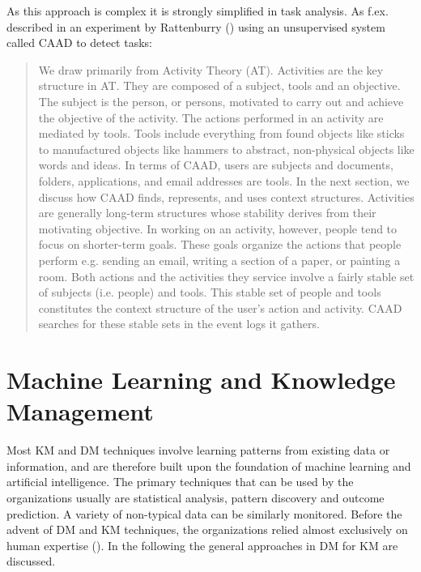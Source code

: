 As this approach is complex it is strongly simplified in task analysis. As f.ex. described in an experiment by Rattenburry (\cite{rattenbury2007caad}) using an unsupervised system called CAAD to detect tasks:
\begin{quotation}
We draw primarily from Activity Theory (AT). Activities are the key structure in AT. They are composed of a subject, tools and an objective. The subject is the person, or persons, motivated to carry out and achieve the objective of the activity. The actions performed in an activity are mediated by tools. Tools include everything from found objects like sticks to manufactured objects like hammers to abstract, non-physical objects like words and ideas. In terms of CAAD, users are subjects and documents, folders, applications, and email addresses are tools. In the next section, we discuss how CAAD finds, represents, and uses context structures. Activities are generally long-term structures whose stability derives from their motivating objective. In working on an activity, however, people tend to focus on shorter-term goals. These goals organize the actions that people perform e.g. sending an email, writing a section of a paper, or painting a room. Both actions and the activities they service involve a fairly stable set of subjects (i.e. people) and tools. This stable set of people and tools constitutes the context structure of the user’s action and activity. CAAD searches for these stable sets in the event logs it gathers.
\end{quotation}


\section{Machine Learning and Knowledge Management}
Most KM and \ac{DM} techniques involve learning patterns from existing data or information, and are therefore built upon the foundation of machine learning and artificial intelligence. The primary techniques that can be used by the organizations usually are statistical analysis, pattern discovery and outcome prediction. A variety of non-typical data can be similarly monitored. Before the advent of \acs{DM} and \acs{KM} techniques, the organizations relied almost exclusively on human expertise (\cite{tsai2012knowledge}). In the following the general approaches in \acs{DM} for \acs{KM} are discussed.

